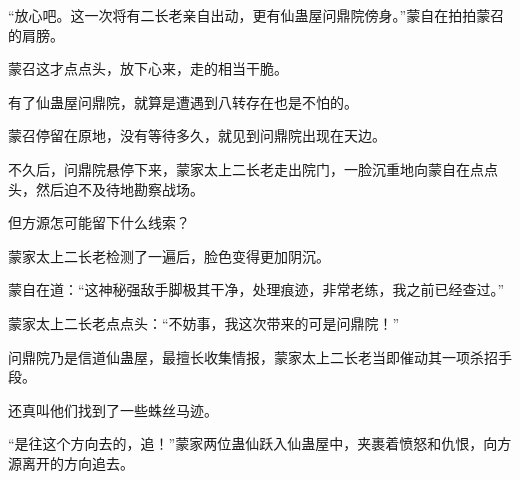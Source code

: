 \begin{this_body}
“放心吧。这一次将有二长老亲自出动，更有仙蛊屋问鼎院傍身。”蒙自在拍拍蒙召的肩膀。

蒙召这才点点头，放下心来，走的相当干脆。

有了仙蛊屋问鼎院，就算是遭遇到八转存在也是不怕的。

蒙召停留在原地，没有等待多久，就见到问鼎院出现在天边。

不久后，问鼎院悬停下来，蒙家太上二长老走出院门，一脸沉重地向蒙自在点点头，然后迫不及待地勘察战场。

但方源怎可能留下什么线索？

蒙家太上二长老检测了一遍后，脸色变得更加阴沉。

蒙自在道：“这神秘强敌手脚极其干净，处理痕迹，非常老练，我之前已经查过。”

蒙家太上二长老点点头：“不妨事，我这次带来的可是问鼎院！”

问鼎院乃是信道仙蛊屋，最擅长收集情报，蒙家太上二长老当即催动其一项杀招手段。

还真叫他们找到了一些蛛丝马迹。

“是往这个方向去的，追！”蒙家两位蛊仙跃入仙蛊屋中，夹裹着愤怒和仇恨，向方源离开的方向追去。

\end{this_body}

